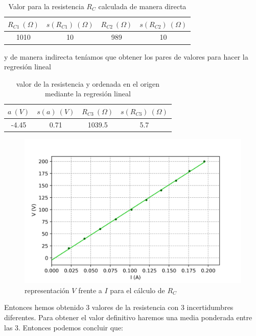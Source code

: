 \documentclass[12pt,a4paper]{article}
\begin{document}
\begin{table}[h!] 	 \centering 
\begin{tabular}{|c|c|c|c|} 
\hline 
$ R_{C1} \ (\Omega)$ & $s(R_{C1}) \ (\Omega) $ & $R_{C2} \ (\Omega)$ & $ s(R_{C2}) \ (\Omega) $ \\ \hline 
1010  & 10 & 989 &  10 \\ 
\hline
\end{tabular} 
\caption{Valor para la resistencia $R_C$ calculada de manera directa} 
\label{tab:} 
\end{table} 

y de manera indirecta teníamos que obtener los pares de valores para hacer la regresión lineal 




\begin{table}[h!] 	 \centering 
\begin{tabular}{|c|c|c|c|} 
\hline 
$a \ (V)$ & $s(a) \ (V)$ & $R_{C3} \ (\Omega)$ & $s(R_{C3}) \ (\Omega)$  \\ \hline 
-4.45 & 0.71 &  1039.5& 5.7 \\ 
\hline
\end{tabular} 
\caption{valor de la resistencia y ordenada en el origen mediante la regresión lineal} 
\label{tab:} 
\end{table} 




\begin{figure}[h!] \centering
\includegraphics[scale=1]{R.png}
\caption{representación $V$ frente a $I$ para el cálculo de $R_C$}
\end{figure}



Entonces hemos obtenido 3 valores de la resistencia con 3 incertidumbres diferentes. Para obtener el valor definitivo haremos una media ponderada entre las 3. Entonces podemos concluir que:
\end{document}
